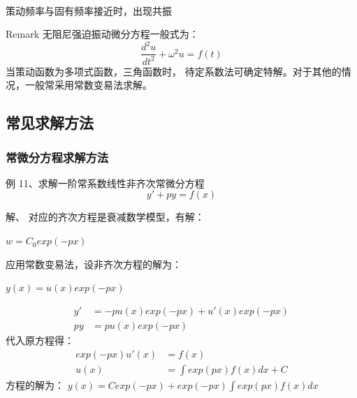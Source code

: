 \begin{frame}
	\centering
	 \\
	策动频率与固有频率接近时，出现共振
\end{frame}

\begin{frame}
	\begin{block} {Remark}
	无阻尼强迫振动微分方程一般式为：
	\begin{equation*}
		\frac{d^2 u}{d t^2} + \omega ^2 u = f(t)
	\end{equation*}
	当策动函数为多项式函数，三角函数时， 待定系数法可确定特解。对于其他的情况，一般常采用常数变易法求解。
	\end{block}
\end{frame}

\subsection{常见求解方法}

\begin{frame}
\frametitle{常微分方程求解方法}
	\begin{exampleblock} {例 11、求解一阶常系数线性非齐次常微分方程}
	\begin{equation*}
		y'+py=f(x)
	\end{equation*}
	\end{exampleblock}
	\alert{解、} 对应的齐次方程是衰减数学模型，有解：\\
	\begin{center}
		$w=C_0 exp(-px)$
	\end{center} 
	应用常数变易法，设非齐次方程的解为：\\
	\begin{center}
		$y(x) =u(x) exp(-px)$
	\end{center} 
\end{frame}

\begin{frame}
	\begin{align*}
		y'&= -p u(x) exp(-px) + u'(x) exp(-px)   \\
		py&= p u(x) exp(-px)
	\end{align*}	
	代入原方程得：
	\begin{align*}
		exp(-px)u'(x)&= f(x)\\
		u(x) &= \int exp(px) f (x)dx + C
	\end{align*}
	方程的解为： $ y(x)=C exp(-px)+exp(-px) \int exp(px)f(x)dx $ \\
\end{frame}

